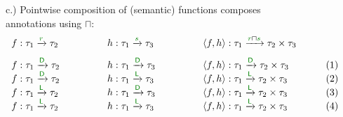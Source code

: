\begin{figure}
{\small c.) Pointwise composition of (semantic) functions composes annotations using $\sqcap$:}
\begin{equation*}
\begin{array}{llll}
f : \tau_1 \xrightarrow{\cclrd{r}} \tau_2 \qquad\qquad&
h : \tau_1 \xrightarrow{\cclrd{s}} \tau_3 \qquad\qquad&
\langle f, h \rangle : \tau_1 \xrightarrow{\cclrd{r} \sqcap \cclrd{s}} \tau_2 \times \tau_3 \qquad&~
\\[0.75em]
f : \tau_1 \xrightarrow{\cclrd{ \ident{D} }} \tau_2 &
h : \tau_1 \xrightarrow{\cclrd{ \ident{D} }} \tau_3 &
\langle f, h \rangle : \tau_1 \xrightarrow{\cclrd{ \ident{D} }} \tau_2 \times \tau_3 & (1)
\\[-0.10em]
f : \tau_1 \xrightarrow{\cclrd{ \ident{D} }} \tau_2 &
h : \tau_1 \xrightarrow{\cclrd{ \ident{L} }} \tau_3 &
\langle f, h \rangle : \tau_1 \xrightarrow{\cclrd{ \ident{L} }} \tau_2 \times \tau_3 & (2)
\\[-0.10em]
f : \tau_1 \xrightarrow{\cclrd{ \ident{L} }} \tau_2 &
h : \tau_1 \xrightarrow{\cclrd{ \ident{D} }} \tau_3 &
\langle f, h \rangle : \tau_1 \xrightarrow{\cclrd{ \ident{L} }} \tau_2 \times \tau_3 & (3)
\\[-0.10em]
f : \tau_1 \xrightarrow{\cclrd{ \ident{L} }} \tau_2 &
h : \tau_1 \xrightarrow{\cclrd{ \ident{L} }} \tau_3 &
\langle f, h \rangle : \tau_1 \xrightarrow{\cclrd{ \ident{L} }} \tau_2 \times \tau_3 & (4)
\end{array}
\end{equation*}

\label{fig:applications-flat-livealg}
\end{figure}


